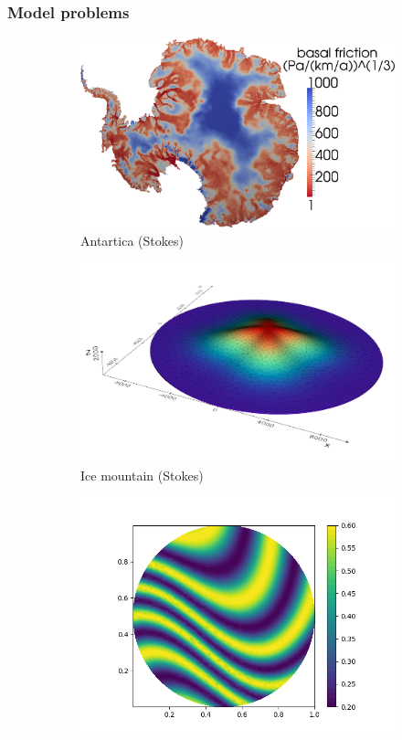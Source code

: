 \documentclass[10pt,final,xcolor=dvipsnames]{beamer}
\begin{document}
\begin{frame}
	\frametitle{Model problems}
	\begin{figure}
		\centering
		\begin{subfigure}[b]{0.3\textwidth}
			\centering
			\includegraphics[width=\textwidth]{beta_cube_cut.png}
			\caption{Antartica (Stokes)}
		\end{subfigure}
		\hfill
		\begin{subfigure}[b]{0.3\textwidth}
			\centering
			\includegraphics[width=\textwidth]{Mesh_Height.png}
			\caption{Ice mountain (Stokes)}
		\end{subfigure}
		\hfill
		\begin{subfigure}[b]{0.3\textwidth}
			\centering
			\includegraphics[width=\textwidth]{heat_swirl.png}

\end{subfigure}
\end{figure}
\end{frame}
\end{document}
